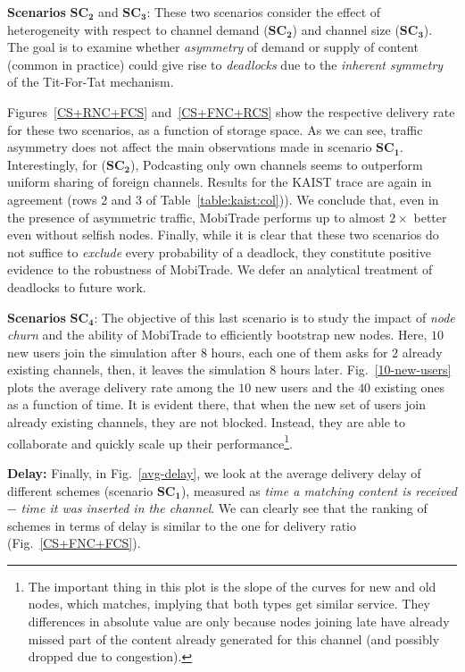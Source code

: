 \noindent \textbf{Scenarios} $\mathbf{SC_{2}}$ and $\mathbf{SC_{3}}$: These two scenarios consider the effect of heterogeneity with respect to channel demand ($\mathbf{SC_{2}}$) and channel size ($\mathbf{SC_{3}}$). The goal is to examine whether \emph{asymmetry} of demand or supply of content (common in practice) could give rise to \emph{deadlocks} due to the \emph{inherent symmetry} of the Tit-For-Tat mechanism.

Figures~\ref{CS+RNC+FCS} and~\ref{CS+FNC+RCS} show the respective delivery rate for these two scenarios, as a function of storage space. As we can see, traffic asymmetry does not affect the main observations made in scenario $\mathbf{SC_{1}}$. Interestingly,  for ($\mathbf{SC_{2}}$), Podcasting only own channels seems to outperform uniform sharing of foreign channels. Results for the KAIST trace are again in agreement (rows 2 and 3 of Table~\ref{table:kaist:col})). We conclude that, even in the presence of asymmetric traffic, MobiTrade performs up to almost $2\times$ better even without selfish nodes. Finally, while it is clear that these two scenarios do not suffice to \emph{exclude} every probability of a deadlock, they constitute positive evidence to the robustness of MobiTrade. We defer an analytical treatment of deadlocks to future work.


\noindent \textbf{Scenarios} $\mathbf{SC_{4}}$: The objective of this last scenario is to study the impact of \emph{node churn} and the ability of MobiTrade to efficiently bootstrap new nodes. Here, $10$ new users join the simulation after $8$ hours, each one of them asks for $2$ already existing channels, then, it leaves the simulation $8$ hours later. Fig.~\ref{10-new-users} plots the average delivery rate among the $10$ new users and the $40$ existing ones as a function of time.
It is evident there, that when the new set of users join already existing channels, they are not blocked. Instead, they are able to collaborate and quickly scale up their performance\footnote{The important thing in this plot is the slope of the curves for new and old nodes, which matches, implying that both types get 
similar service. They differences in absolute value are only because nodes joining late have already missed part of the content already generated for this channel (and possibly dropped due to congestion).}.

\noindent \textbf{Delay:} Finally, in Fig.~\ref{avg-delay}, we look at the average delivery delay of different schemes (scenario $\mathbf{SC_{1}}$), measured as \emph{time a matching content is received} $-$ \emph{time it was inserted in the channel}. We can clearly see that the ranking of schemes in terms of delay is similar to the one for delivery ratio (Fig.~\ref{CS+FNC+FCS}).


